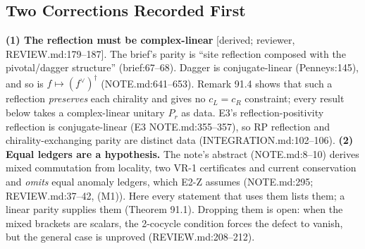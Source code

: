 
\subsection{Two Corrections Recorded First}

\textbf{(1) The reflection must be complex-linear} [derived; reviewer, REVIEW.md:179--187].  The brief's parity is
``site reflection composed with the pivotal/dagger structure'' (brief:67--68).  Dagger is conjugate-linear
(Penneys:145), and so is \(f\mapsto(f^\vee)^\dagger\) (NOTE.md:641--653).  Remark 91.4 shows that such a reflection
\emph{preserves} each chirality and gives no \(c_L=c_R\) constraint; every result below takes a complex-linear
unitary \(P_r\) as data.  E3's reflection-positivity reflection is conjugate-linear (E3 NOTE.md:355--357), so RP
reflection and chirality-exchanging parity are distinct data (INTEGRATION.md:102--106).
\textbf{(2) Equal ledgers are a hypothesis.}  The note's abstract (NOTE.md:8--10) derives mixed commutation from
locality, two VR-1 certificates and current conservation and \emph{omits} equal anomaly ledgers, which E2-Z
assumes (NOTE.md:295; REVIEW.md:37--42, (M1)).  Here every statement that uses them lists them; a linear parity
supplies them (Theorem 91.1).  Dropping them is open: when the mixed brackets are scalars, the 2-cocycle
condition forces the defect to vanish, but the general case is unproved (REVIEW.md:208--212).

